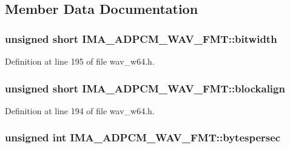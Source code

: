 \subsection{Member Data Documentation}
\subsubsection[{\texorpdfstring{bitwidth}{bitwidth}}]{\setlength{\rightskip}{0pt plus 5cm}unsigned short I\+M\+A\+\_\+\+A\+D\+P\+C\+M\+\_\+\+W\+A\+V\+\_\+\+F\+M\+T\+::bitwidth}\hypertarget{struct_i_m_a___a_d_p_c_m___w_a_v___f_m_t_ad72c9fb895e367087e0361d8d7f246b8}{}\label{struct_i_m_a___a_d_p_c_m___w_a_v___f_m_t_ad72c9fb895e367087e0361d8d7f246b8}


Definition at line 195 of file wav\+\_\+w64.\+h.

\subsubsection[{\texorpdfstring{blockalign}{blockalign}}]{\setlength{\rightskip}{0pt plus 5cm}unsigned short I\+M\+A\+\_\+\+A\+D\+P\+C\+M\+\_\+\+W\+A\+V\+\_\+\+F\+M\+T\+::blockalign}\hypertarget{struct_i_m_a___a_d_p_c_m___w_a_v___f_m_t_a6825977def909303f455591eba87accc}{}\label{struct_i_m_a___a_d_p_c_m___w_a_v___f_m_t_a6825977def909303f455591eba87accc}


Definition at line 194 of file wav\+\_\+w64.\+h.

\subsubsection[{\texorpdfstring{bytespersec}{bytespersec}}]{\setlength{\rightskip}{0pt plus 5cm}unsigned {\bf int} I\+M\+A\+\_\+\+A\+D\+P\+C\+M\+\_\+\+W\+A\+V\+\_\+\+F\+M\+T\+::bytespersec}\hypertarget{struct_i_m_a___a_d_p_c_m___w_a_v___f_m_t_a2a14a06ba191178dfc4f69c7568ae2a6}{}\label{struct_i_m_a___a_d_p_c_m___w_a_v___f_m_t_a2a14a06ba191178dfc4f69c7568ae2a6}



